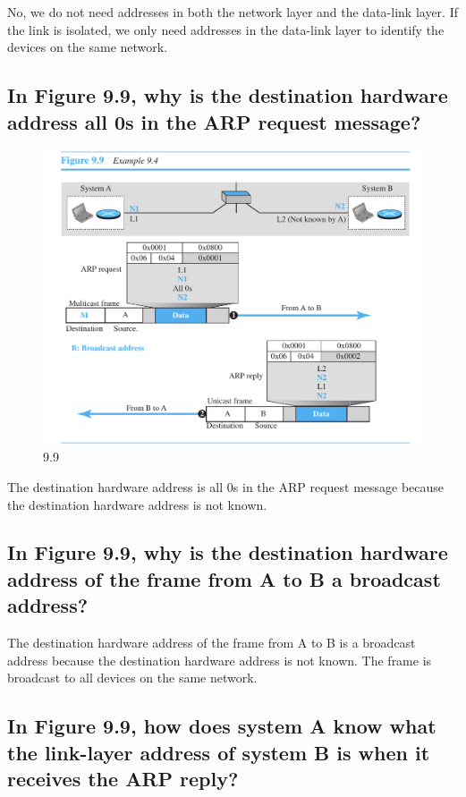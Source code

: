 \documentclass{article}
\begin{document}
No, we do not need addresses in both the network layer and the data-link layer. If the link is isolated, we only need addresses in the data-link layer to identify the devices on the same network.

\subsection{
	In Figure 9.9, why is the destination hardware address all 0s in the ARP
	request message?
}

\begin{figure}[H]
	\center
	\includegraphics[scale=0.5]{9.9.png}
	\caption{9.9}
\end{figure}

The destination hardware address is all 0s in the ARP request message because the destination hardware address is not known.

\subsection{
	In Figure 9.9, why is the destination hardware address of the frame from A to
	B a broadcast address?
}

The destination hardware address of the frame from A to B is a broadcast address because the destination hardware address is not known. The frame is broadcast to all devices on the same network.

\subsection{
	In Figure 9.9, how does system A know what the link-layer address of system
	B is when it receives the ARP reply?
}
\end{document}
